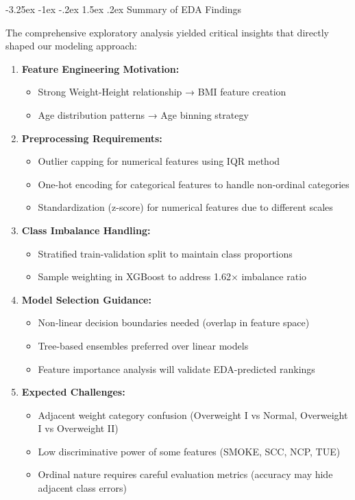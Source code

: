 \documentclass[12pt,a4paper]{article}
\makeatletter
\renewcommand{\subsection}{\@startsection{subsection}{2}{\z@}%
                                   {-3.25ex \@plus -1ex \@minus -.2ex}%
                                   {1.5ex \@plus .2ex}%
                                   {\normalfont\large\bfseries\vspace{0.3\baselineskip}}}
\makeatother
\begin{document}
\subsection{Summary of EDA Findings}

The comprehensive exploratory analysis yielded critical insights that directly shaped our modeling approach:

\begin{enumerate}
    \item \textbf{Feature Engineering Motivation:} 
    \begin{itemize}
        \item Strong Weight-Height relationship → BMI feature creation
        \item Age distribution patterns → Age binning strategy
    \end{itemize}
    \newpage
    
    \item \textbf{Preprocessing Requirements:}
    \begin{itemize}
        \item Outlier capping for numerical features using IQR method
        \item One-hot encoding for categorical features to handle non-ordinal categories
        \item Standardization (z-score) for numerical features due to different scales
    \end{itemize}
    
    \item \textbf{Class Imbalance Handling:}
    \begin{itemize}
        \item Stratified train-validation split to maintain class proportions
        \item Sample weighting in XGBoost to address 1.62× imbalance ratio
    \end{itemize}
    
    \item \textbf{Model Selection Guidance:}
    \begin{itemize}
        \item Non-linear decision boundaries needed (overlap in feature space)
        \item Tree-based ensembles preferred over linear models
        \item Feature importance analysis will validate EDA-predicted rankings
    \end{itemize}
    
    \item \textbf{Expected Challenges:}
    \begin{itemize}
        \item Adjacent weight category confusion (Overweight I vs Normal, Overweight I vs Overweight II)
        \item Low discriminative power of some features (SMOKE, SCC, NCP, TUE)
        \item Ordinal nature requires careful evaluation metrics (accuracy may hide adjacent class errors)
    \end{itemize}
\end{enumerate}
\end{document}
